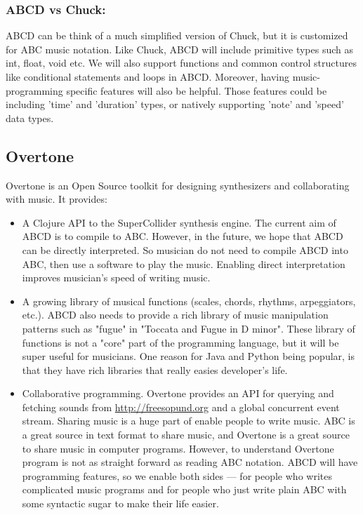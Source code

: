 	\subsubsection{ABCD vs Chuck:}
	ABCD can be think of a much simplified version of Chuck, but it is customized for ABC music notation. Like Chuck, ABCD will include primitive types such as int, float, void etc. We will also support functions and common control structures like conditional statements and loops in ABCD. Moreover, having music-programming specific features will also be helpful. Those features could be including 'time' and 'duration' types, or natively supporting 'note' and 'speed' data types.
	 

\subsection{Overtone}

Overtone is an Open Source toolkit for designing synthesizers and collaborating with music. It provides\cite{Aaron16}:
\begin{itemize}
\item A Clojure API to the SuperCollider synthesis engine. The current aim of ABCD is to compile to ABC. However, in the future, we hope that ABCD can be directly interpreted. So musician do not need to compile ABCD into ABC, then use a software to play the music. Enabling direct interpretation improves musician's speed of writing music.
\item A growing library of musical functions (scales, chords, rhythms, arpeggiators, etc.). ABCD also needs to provide a rich library of music manipulation patterns such as "fugue" in "Toccata and Fugue in D minor". These library of functions is not a "core" part of the programming language, but it will be super useful for musicians. One reason for Java and Python being popular, is that they have rich libraries that really easies developer's life.
\item Collaborative programming. Overtone provides an API for querying and fetching sounds from \url{http://freesopund.org} and a global concurrent event stream\cite{Aaron16}. Sharing music is a huge part of enable people to write music. ABC is a great source in text format to share music, and Overtone is a great source to share music in computer programs. However, to understand Overtone program is not as straight forward as reading ABC notation. ABCD will have programming features, so we enable both sides --- for people who writes complicated music programs and for people who just write plain ABC with some syntactic sugar to make their life easier.
\end{itemize}

